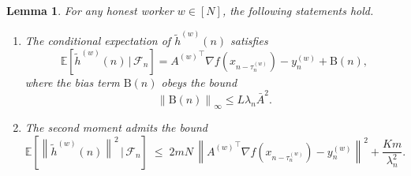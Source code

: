\documentclass{article}
\newtheorem{lemma}[theorem]{Lemma}
\newcommand{\norm}[1]{\left\lVert #1 \right\rVert}
\begin{document}
\begin{lemma}
For any honest worker $w \in [N]$, the following statements hold.

\begin{enumerate}
\item[(a)] The conditional expectation of $\widetilde{h}^{(w)}(n)$ satisfies
\begin{equation*}
\mathbb{E}\!\left[\widetilde{h}^{(w)}(n) \,\big|\, \mathcal{F}_n\right] 
= {A^{(w)}}^\top \nabla f(x_{n-\tau_n^{(w)}}) - y_n^{(w)} + \mathrm{B}(n),
\end{equation*}
where the bias term $\mathrm{B}(n)$ obeys the bound
\begin{equation*}
\norm{\mathrm{B}(n)}_\infty \leq L \lambda_n \bar{A}^2.
\end{equation*}

\item[(b)] The second moment admits the bound
\begin{equation*}
\mathbb{E}\!\left[\norm{\widetilde{h}^{(w)}(n)}^2 \,\big|\, \mathcal{F}_n\right]
\;\leq\; 
2 mN \, \norm{ {A^{(w)}}^\top\nabla f(x_{n-\tau_n^{(w)}}) - y_n^{(w)} }^2 
+ \frac{K m}{\lambda_n^2}.
\end{equation*}
\end{enumerate}

\label{lem:approximated gradient}
\end{lemma}
\end{document}
